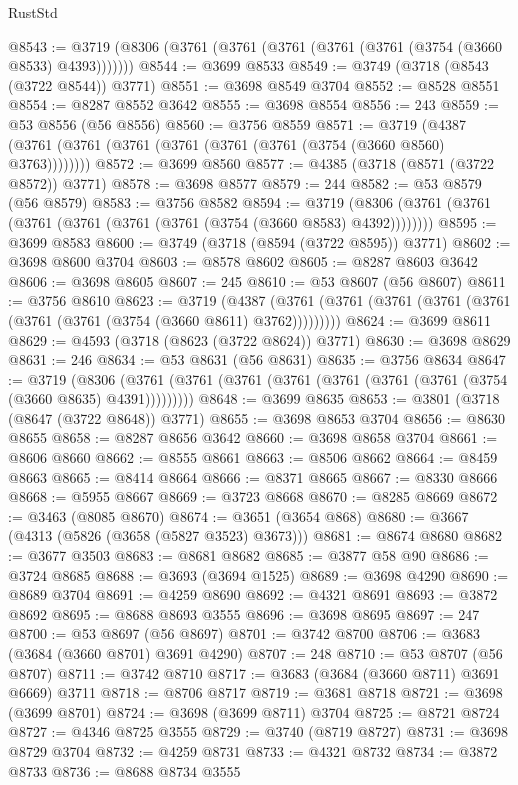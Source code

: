 \begin{lexlean}{RustStd}
\begin{coremodule}
{\begin{coremodule}
{{{{{{{{{{{{{{{{{{{{{{{{{{{{{{{{{{{{{{{{{{{{{{{@8543 := @3719 (@8306 (@3761 (@3761 (@3761 (@3761 (@3761 (@3754 (@3660 @8533) @4393)))))))
@8544 := @3699 @8533
@8549 := @3749 (@3718 (@8543 (@3722 @8544)) @3771)
@8551 := @3698 @8549 @3704
@8552 := @8528 @8551
@8554 := @8287 @8552 @3642
@8555 := @3698 @8554
@8556 := 243
@8559 := @53 @8556 (@56 @8556)
@8560 := @3756 @8559
@8571 := @3719 (@4387 (@3761 (@3761 (@3761 (@3761 (@3761 (@3761 (@3754 (@3660 @8560) @3763))))))))
@8572 := @3699 @8560
@8577 := @4385 (@3718 (@8571 (@3722 @8572)) @3771)
@8578 := @3698 @8577
@8579 := 244
@8582 := @53 @8579 (@56 @8579)
@8583 := @3756 @8582
@8594 := @3719 (@8306 (@3761 (@3761 (@3761 (@3761 (@3761 (@3761 (@3754 (@3660 @8583) @4392))))))))
@8595 := @3699 @8583
@8600 := @3749 (@3718 (@8594 (@3722 @8595)) @3771)
@8602 := @3698 @8600 @3704
@8603 := @8578 @8602
@8605 := @8287 @8603 @3642
@8606 := @3698 @8605
@8607 := 245
@8610 := @53 @8607 (@56 @8607)
@8611 := @3756 @8610
@8623 := @3719
    (@4387 (@3761 (@3761 (@3761 (@3761 (@3761 (@3761 (@3761 (@3754 (@3660 @8611) @3762)))))))))
@8624 := @3699 @8611
@8629 := @4593 (@3718 (@8623 (@3722 @8624)) @3771)
@8630 := @3698 @8629
@8631 := 246
@8634 := @53 @8631 (@56 @8631)
@8635 := @3756 @8634
@8647 := @3719
    (@8306 (@3761 (@3761 (@3761 (@3761 (@3761 (@3761 (@3761 (@3754 (@3660 @8635) @4391)))))))))
@8648 := @3699 @8635
@8653 := @3801 (@3718 (@8647 (@3722 @8648)) @3771)
@8655 := @3698 @8653 @3704
@8656 := @8630 @8655
@8658 := @8287 @8656 @3642
@8660 := @3698 @8658 @3704
@8661 := @8606 @8660
@8662 := @8555 @8661
@8663 := @8506 @8662
@8664 := @8459 @8663
@8665 := @8414 @8664
@8666 := @8371 @8665
@8667 := @8330 @8666
@8668 := @5955 @8667
@8669 := @3723 @8668
@8670 := @8285 @8669
@8672 := @3463 (@8085 @8670)
@8674 := @3651 (@3654 @868)
@8680 := @3667 (@4313 (@5826 (@3658 (@5827 @3523) @3673)))
@8681 := @8674 @8680
@8682 := @3677 @3503
@8683 := @8681 @8682
@8685 := @3877 @58 @90
@8686 := @3724 @8685
@8688 := @3693 (@3694 @1525)
@8689 := @3698 @4290
@8690 := @8689 @3704
@8691 := @4259 @8690
@8692 := @4321 @8691
@8693 := @3872 @8692
@8695 := @8688 @8693 @3555
@8696 := @3698 @8695
@8697 := 247
@8700 := @53 @8697 (@56 @8697)
@8701 := @3742 @8700
@8706 := @3683 (@3684 (@3660 @8701) @3691 @4290)
@8707 := 248
@8710 := @53 @8707 (@56 @8707)
@8711 := @3742 @8710
@8717 := @3683 (@3684 (@3660 @8711) @3691 @6669) @3711
@8718 := @8706 @8717
@8719 := @3681 @8718
@8721 := @3698 (@3699 @8701)
@8724 := @3698 (@3699 @8711) @3704
@8725 := @8721 @8724
@8727 := @4346 @8725 @3555
@8729 := @3740 (@8719 @8727)
@8731 := @3698 @8729 @3704
@8732 := @4259 @8731
@8733 := @4321 @8732
@8734 := @3872 @8733
@8736 := @8688 @8734 @3555
}}}}}}}}}}}}}}}}}}}}}}}}}}}}}}}}}}}}}}}}}}}}}}}
\end{coremodule}}
\end{coremodule}
\end{lexlean}
